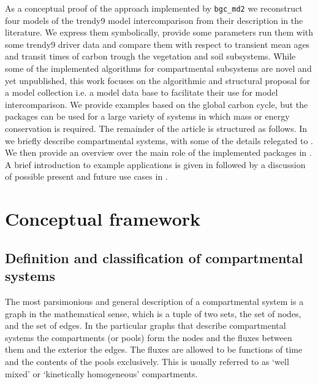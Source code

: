 As a conceptual proof of the  approach implemented by \texttt{bgc\_md2}
we reconstruct four models of the trendy9 model intercomparison from their description in the literature.
We express them symbolically, provide some parameters run them with some trendy9 driver data and
compare them with respect to transient mean ages and transit times of carbon
trough the vegetation and soil subsystems.  
While some of the implemented algorithms for compartmental subsystems are novel 
and yet unpublished, this work focuses on the algorithmic and structural proposal for a model collection
i.e. a model data base to facilitate their use for model intercomparison. 
We provide examples based on the global carbon cycle, but the
packages can be used for a large variety of systems in which mass or energy
conservation is required.
The remainder of the article is structured as follows.
In  we briefly describe compartmental systems, with some of the details
relegated to .
We then provide an overview over the main role of the implemented packages in 
. A brief introduction to example applications
is given in  followed by a discussion of
possible present and future use cases in
.




\section{Conceptual framework}
\label{sec:ConceptualFramework}
\subsection{Definition and classification of compartmental systems} 
The most parsimonious and general description of a compartmental system is a graph in
the mathematical sense, which is a tuple of two sets, the set of nodes, and the
set of edges.  In the particular graphs that describe compartmental systems the
compartments (or pools) form the nodes and the fluxes between them and the
exterior the edges.  The fluxes are allowed to be functions of time and the
contents of the pools exclusively. This is usually referred to as `well mixed' or
`kinetically homogeneous' compartments.  

